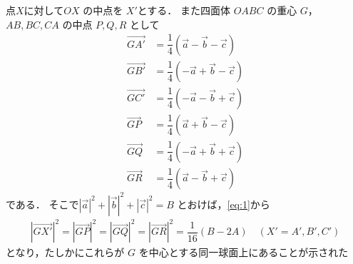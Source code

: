 \documentclass[../../main.tex]{subfiles}
\begin{document}
点$X$に対して$OX$ の中点を $X'$とする．
また四面体 $OABC$ の重心 $G$，$AB, BC, CA$ の中点 $P, Q, R$ として
\begin{align}
  \overrightarrow{GA'} &= \dfrac{1}{4} (\vec{a} - \vec{b} - \vec{c}) \\
  \overrightarrow{GB'} &= \dfrac{1}{4} (-\vec{a} + \vec{b} - \vec{c}) \\
  \overrightarrow{GC'} &= \dfrac{1}{4} (-\vec{a} - \vec{b} + \vec{c}) \\
  \overrightarrow{GP} &= \dfrac{1}{4} (\vec{a} + \vec{b} - \vec{c}) \\
  \overrightarrow{GQ} &= \dfrac{1}{4} (-\vec{a} + \vec{b} + \vec{c}) \\
  \overrightarrow{GR} &= \dfrac{1}{4} (\vec{a} - \vec{b} + \vec{c})
\end{align}
である．
そこで$|\vec{a}|^2 + |\vec{b}|^2 + |\vec{c}|^2 = B$ とおけば，\cref{eq:1}から
\begin{align}
  |\overrightarrow{GX'}|^2 = |\overrightarrow{GP}|^2 = |\overrightarrow{GQ}|^2 = |\overrightarrow{GR}|^2 = \dfrac{1}{16} (B - 2A) \quad (X' = A', B', C')
\end{align}
となり，たしかにこれらが $G$ を中心とする同一球面上にあることが示された
\end{document}
